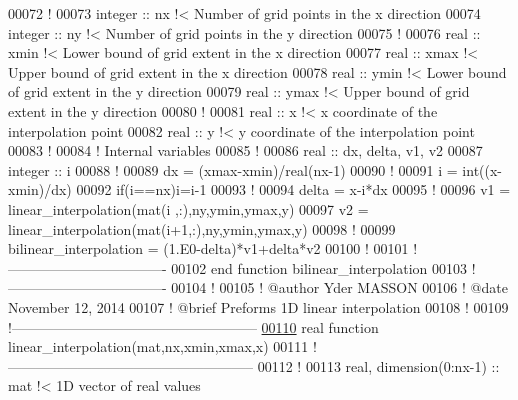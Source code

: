 \begin{DoxyCode}
00072 \textcolor{comment}{!}
00073 \textcolor{keywordtype}{integer} :: nx \textcolor{comment}{!< Number of grid points in the x direction}
00074 \textcolor{keywordtype}{integer} :: ny \textcolor{comment}{!< Number of grid points in the y direction}
00075 \textcolor{comment}{!}
00076 \textcolor{keywordtype}{real} :: xmin \textcolor{comment}{!< Lower bound of grid extent in the x direction}
00077 \textcolor{keywordtype}{real} :: xmax \textcolor{comment}{!< Upper bound of grid extent in the x direction}
00078 \textcolor{keywordtype}{real} :: ymin \textcolor{comment}{!< Lower bound of grid extent in the y direction}
00079 \textcolor{keywordtype}{real} :: ymax \textcolor{comment}{!< Upper bound of grid extent in the y direction}
00080 \textcolor{comment}{!}
00081 \textcolor{keywordtype}{real} :: x \textcolor{comment}{!< x coordinate of the interpolation point }
00082 \textcolor{keywordtype}{real} :: y \textcolor{comment}{!< y coordinate of the interpolation point }
00083 \textcolor{comment}{!}
00084 \textcolor{comment}{! Internal variables}
00085 \textcolor{comment}{!}
00086 \textcolor{keywordtype}{real} :: dx, delta, v1, v2
00087 \textcolor{keywordtype}{integer} :: i
00088 \textcolor{comment}{!}
00089 dx = (xmax-xmin)/\textcolor{keywordtype}{real}(nx-1)
00090 \textcolor{comment}{!}
00091 i = int((x-xmin)/dx)
00092 \textcolor{keyword}{if}(i==nx)i=i-1
00093 \textcolor{comment}{!}
00094 delta = x-i*dx
00095 \textcolor{comment}{!}
00096 v1 = linear\_interpolation(mat(i  ,:),ny,ymin,ymax,y)
00097 v2 = linear\_interpolation(mat(i+1,:),ny,ymin,ymax,y)
00098 \textcolor{comment}{!}
00099 bilinear\_interpolation = (1.E0-delta)*v1+delta*v2 
00100 \textcolor{comment}{! }
00101 \textcolor{comment}{!----------------------------------}
00102 \textcolor{keyword}{end function bilinear\_interpolation}
00103 \textcolor{comment}{!----------------------------------}
00104 \textcolor{comment}{!}
00105 \textcolor{comment}{! @author Yder MASSON}
00106 \textcolor{comment}{! @date November 12, 2014}
00107 \textcolor{comment}{! @brief Preforms 1D linear interpolation }
00108 \textcolor{comment}{!}
00109 \textcolor{comment}{!-----------------------------------------------------}
\hypertarget{module__interpolation_8f90_source_l00110}{}\hyperlink{classmodule__interpolation_a174ca6e4c79e7b933ae04e6d4db3a348}{00110} \textcolor{keyword}{real }\textcolor{keyword}{function }linear\_interpolation(mat,nx,xmin,xmax,x)
00111 \textcolor{comment}{!-----------------------------------------------------}
00112 \textcolor{comment}{!}
00113 \textcolor{keywordtype}{real}, \textcolor{keywordtype}{dimension(0:nx-1)} :: mat \textcolor{comment}{!< 1D vector of real values }

\end{DoxyCode}
